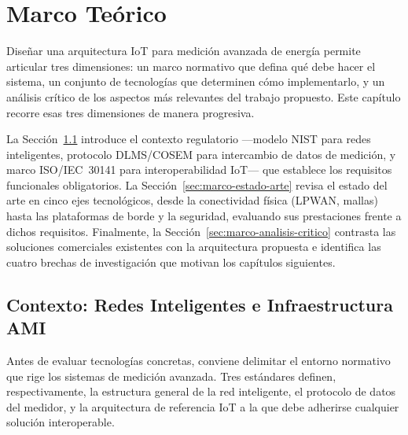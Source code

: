 \chapter{Marco Teórico}
\label{chap:marco-teorico}


Diseñar una arquitectura IoT para medición avanzada de energía permite articular tres dimensiones: un marco normativo que defina qué debe hacer el sistema, un conjunto de tecnologías que determinen cómo implementarlo, y un análisis crítico de los aspectos más relevantes del trabajo propuesto. Este capítulo recorre esas tres dimensiones de manera progresiva.

La Sección~\ref{sec:marco-smart-energy} introduce el contexto regulatorio ---modelo NIST para redes inteligentes, protocolo DLMS/COSEM para intercambio de datos de medición, y marco ISO/IEC~30141 para interoperabilidad IoT--- que establece los requisitos funcionales obligatorios. La Sección~\ref{sec:marco-estado-arte} revisa el estado del arte en cinco ejes tecnológicos, desde la conectividad física (LPWAN, mallas) hasta las plataformas de borde y la seguridad, evaluando sus prestaciones frente a dichos requisitos. Finalmente, la Sección~\ref{sec:marco-analisis-critico} contrasta las soluciones comerciales existentes con la arquitectura propuesta e identifica las cuatro brechas de investigación que motivan los capítulos siguientes.


\section{Contexto: Redes Inteligentes e Infraestructura AMI}
\label{sec:marco-smart-energy}

Antes de evaluar tecnologías concretas, conviene delimitar el entorno normativo que rige los sistemas de medición avanzada. Tres estándares definen, respectivamente, la estructura general de la red inteligente, el protocolo de datos del medidor, y la arquitectura de referencia IoT a la que debe adherirse cualquier solución interoperable.

